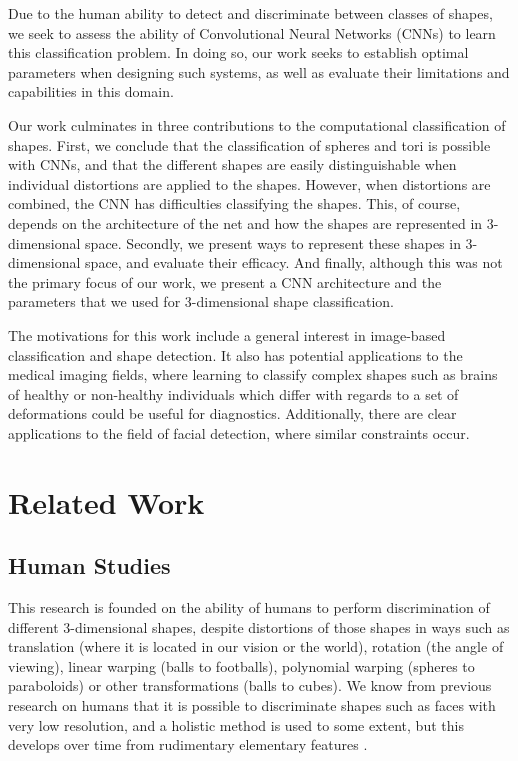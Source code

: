 \documentclass{article}
\begin{document}
Due to the human ability to detect and discriminate between
classes of shapes, we seek to assess the ability of Convolutional Neural Networks (CNNs) to learn this classification problem. In doing so, our work seeks to establish optimal parameters when designing such systems,
as well as evaluate their limitations and capabilities in this domain.

Our work culminates in three contributions to the computational classification of shapes.
First, we conclude that the classification of spheres and tori is possible with CNNs,
and that the different shapes are easily distinguishable when individual distortions are
applied to the shapes. However, when distortions are combined, the CNN has difficulties classifying the shapes. This, of course, depends on the architecture of the net and how the shapes are represented
in 3-dimensional space. Secondly, we present ways to represent these shapes in 3-dimensional space,
and evaluate their efficacy. And finally, although this was not the primary focus of our work,
we present a CNN architecture and the parameters that we used for 3-dimensional shape classification.

The motivations for this work include a general interest in image-based classification and shape detection.
It also has potential applications to the medical imaging fields, where learning to classify complex shapes
such as brains of healthy or non-healthy individuals which differ with regards to a set of deformations could
be useful for diagnostics. Additionally, there are clear applications to the field of facial detection, where
similar constraints occur.

\section{Related Work}

\subsection{Human Studies}
This research is founded on the ability of humans to perform discrimination of different 3-dimensional shapes,
despite distortions of those shapes in ways such as translation (where it is located in our vision or the world), rotation (the angle of viewing), linear warping (balls to footballs), polynomial warping (spheres to paraboloids) or other transformations (balls to cubes). We know from previous research on humans that
it is possible to discriminate shapes such as faces with very low resolution, and a holistic method is used to some extent,
but this develops over time from rudimentary elementary features \cite{sinha2006face}.
\end{document}
